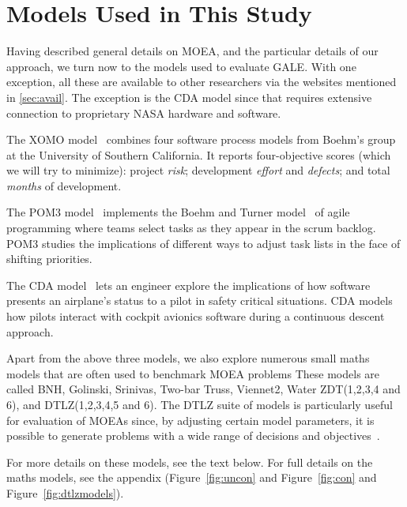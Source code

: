 \documentclass[10pt,journal,compsoc]{IEEEtran}
\newcommand{\tion}[1]{\textsection\ref{sec:#1}}
\newcommand{\fig}[1]{Figure~\ref{fig:#1}}
\newenvironment{changed}{\par\color{MyDarkBlue}}{\par}
\newcommand{\addit}[1]{\begin{changed}\end{changed}}
\begin{document}
\begin{changed}
\addit{cocont}

\section{Models Used in This Study}\label{sec:models}
Having described general details on MOEA, and the particular details of our approach,
we turn now to the models used to evaluate GALE.
With one exception, all these  are available to other researchers via the websites mentioned in 
\tion{avail}. The exception is the CDA model since that
requires extensive connection to proprietary NASA hardware and software.

The XOMO model~\cite{me07f,me09a,me09e}
combines four software process models from
Boehm’s group at the University of Southern California.
It reports four-objective scores (which we will try to minimize):
project {\em risk};
development {\em effort} and {\em defects}; and total {\em months} of development.

The POM3 model~\cite{port08,me09j}  implements the Boehm and Turner model~\cite{port08,1204376,turner03}
of agile programming
where teams select tasks as they appear in the scrum backlog.
POM3 studies the implications of different ways to adjust task lists in the face of shifting priorities.



The CDA model~\cite{Kim2011,Pritchett2011,Feigh2012,Kim2013,Pritchett2013}
lets an engineer explore the implications of how software presents an airplane's status to a pilot
in safety critical situations.
CDA models how pilots interact with cockpit avionics software
during a continuous descent approach.

Apart from the above three models, we also explore numerous
small maths models that are often used
to benchmark MOEA
problems 
These models are called 
BNH, 
Golinski, 
Srinivas, 
Two-bar Truss, 
Viennet2, 
Water 
ZDT(1,2,3,4 and 6), 
and DTLZ(1,2,3,4,5 and 6).
The  DTLZ suite of models is particularly useful for evaluation of MOEAs since,
by adjusting certain model  parameters, it is possible to generate
problems with a wide range of decisions and objectives~\cite{Zitzler2000zdtpaper,dtlz2001a}.

For more details on these models, see the text below.
For full details on the maths models, see the appendix
(\fig{uncon} and \fig{con} and \fig{dtlzmodels}).





\addit{xomo}

\addit{xomocases}

\end{changed}
\end{document}
